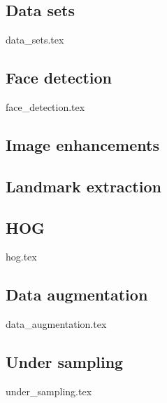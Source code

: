 \subsection{Data sets}
{data_sets.tex}

\subsection{Face detection}
{face_detection.tex}

\subsection{Image enhancements}


\subsection{Landmark extraction}


\subsection{HOG}
{hog.tex}

\subsection{Data augmentation}
{data_augmentation.tex}

\subsection{Under sampling}
{under_sampling.tex}